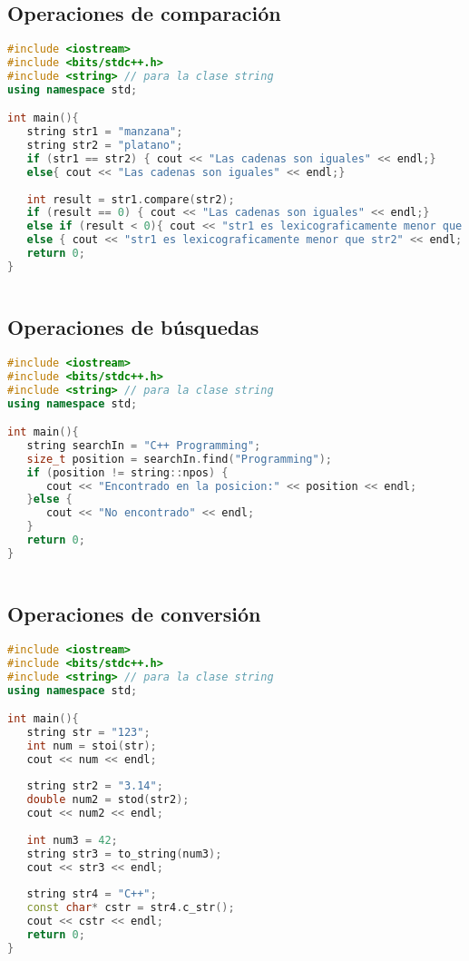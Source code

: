 \subsection{Operaciones de comparación}
\begin{lstlisting}[language=C++]
#include <iostream>
#include <bits/stdc++.h>
#include <string> // para la clase string
using namespace std;

int main(){
   string str1 = "manzana";
   string str2 = "platano";
   if (str1 == str2) { cout << "Las cadenas son iguales" << endl;}
   else{ cout << "Las cadenas son iguales" << endl;}
	
   int result = str1.compare(str2);
   if (result == 0) { cout << "Las cadenas son iguales" << endl;}
   else if (result < 0){ cout << "str1 es lexicograficamente menor que str2" << endl; }
   else { cout << "str1 es lexicograficamente menor que str2" << endl; }
   return 0;
}
	
\end{lstlisting}
\subsection{Operaciones de búsquedas}
\begin{lstlisting}[language=C++]
#include <iostream>
#include <bits/stdc++.h>
#include <string> // para la clase string
using namespace std;

int main(){
   string searchIn = "C++ Programming"; 
   size_t position = searchIn.find("Programming"); 
   if (position != string::npos) { 
      cout << "Encontrado en la posicion:" << position << endl; 
   }else { 
      cout << "No encontrado" << endl; 
   } 
   return 0;
}
	
\end{lstlisting}
\subsection{Operaciones de conversión}
\begin{lstlisting}[language=C++]
#include <iostream>
#include <bits/stdc++.h>
#include <string> // para la clase string
using namespace std;

int main(){
   string str = "123";
   int num = stoi(str);
   cout << num << endl;
	
   string str2 = "3.14";
   double num2 = stod(str2);
   cout << num2 << endl;
	
   int num3 = 42;
   string str3 = to_string(num3);
   cout << str3 << endl;
	
   string str4 = "C++";
   const char* cstr = str4.c_str();
   cout << cstr << endl;
   return 0;
}
	
\end{lstlisting}